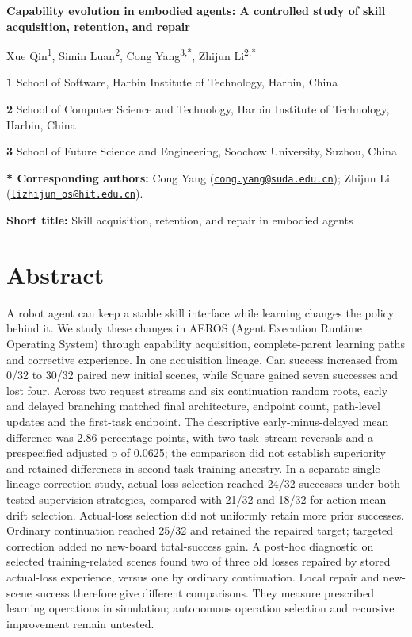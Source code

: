 \documentclass[10pt,letterpaper]{article}
\begin{document}
\begin{flushleft}
{\Large\textbf{Capability evolution in embodied agents: A controlled study of skill acquisition, retention, and repair}}

\bigskip
Xue Qin\textsuperscript{1}, Simin Luan\textsuperscript{2}, Cong Yang\textsuperscript{3,*}, Zhijun Li\textsuperscript{2,*}

\bigskip
\textbf{1} School of Software, Harbin Institute of Technology, Harbin, China

\textbf{2} School of Computer Science and Technology, Harbin Institute of Technology, Harbin, China

\textbf{3} School of Future Science and Engineering, Soochow University, Suzhou, China

\bigskip
\textbf{* Corresponding authors:} Cong Yang (\href{mailto:cong.yang@suda.edu.cn}{\nolinkurl{cong.yang@suda.edu.cn}}); Zhijun Li (\href{mailto:lizhijun_os@hit.edu.cn}{\nolinkurl{lizhijun_os@hit.edu.cn}}).

\bigskip
\textbf{Short title:} Skill acquisition, retention, and repair in embodied agents
\end{flushleft}
\clearpage
\linenumbers

\section*{Abstract}\label{abstract}

A robot agent can keep a stable skill interface while learning changes
the policy behind it. We study these changes in AEROS (Agent Execution
Runtime Operating System) through capability acquisition,
complete-parent learning paths and corrective experience. In one
acquisition lineage, Can success increased from 0/32 to 30/32 paired new
initial scenes, while Square gained seven successes and lost four.
Across two request streams and six continuation random roots, early and
delayed branching matched final architecture, endpoint count, path-level
updates and the first-task endpoint. The descriptive early-minus-delayed
mean difference was 2.86 percentage points, with two task--stream
reversals and a prespecified adjusted p of 0.0625; the comparison did
not establish superiority and retained differences in second-task
training ancestry. In a separate single-lineage correction study,
actual-loss selection reached 24/32 successes under both tested
supervision strategies, compared with 21/32 and 18/32 for action-mean
drift selection. Actual-loss selection did not uniformly retain more
prior successes. Ordinary continuation reached 25/32 and retained the
repaired target; targeted correction added no new-board total-success
gain. A post-hoc diagnostic on selected training-related scenes found
two of three old losses repaired by stored actual-loss experience,
versus one by ordinary continuation. Local repair and new-scene success
therefore give different comparisons. They measure prescribed learning
operations in simulation; autonomous operation selection and recursive
improvement remain untested.
\end{document}
